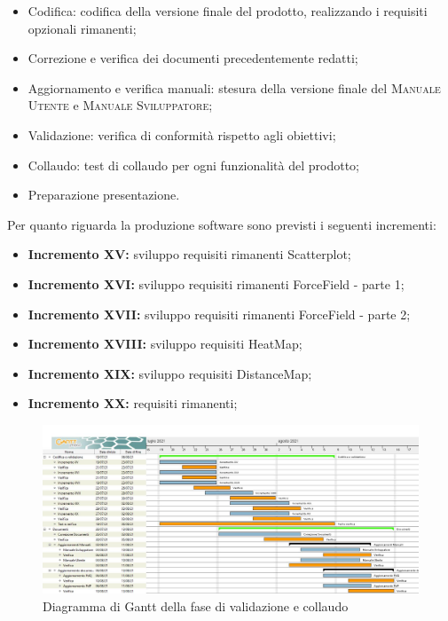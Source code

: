 \documentclass[../piano_di_progetto.tex]{subfiles}
\begin{document}
\begin{itemize}
    \item Codifica: codifica della versione finale del prodotto, realizzando i requisiti opzionali rimanenti;
    \item Correzione e verifica dei documenti precedentemente redatti;
    \item Aggiornamento e verifica manuali: stesura della versione finale del \textsc{Manuale Utente} e \textsc{Manuale Sviluppatore};
    \item Validazione: verifica di conformità rispetto agli obiettivi;
    \item Collaudo: test di collaudo per ogni funzionalità del prodotto;
    \item Preparazione presentazione.
\end{itemize}

Per quanto riguarda la produzione software sono previsti i seguenti incrementi:
\begin{itemize}
    \item \textbf{Incremento XV:} sviluppo requisiti rimanenti Scatterplot;
    \item \textbf{Incremento XVI:} sviluppo requisiti rimanenti ForceField - parte 1;
    \item \textbf{Incremento XVII:} sviluppo requisiti rimanenti ForceField - parte 2;
    \item \textbf{Incremento XVIII:} sviluppo requisiti HeatMap;
    \item \textbf{Incremento XIX:} sviluppo requisiti DistanceMap;
    \item \textbf{Incremento XX:} requisiti rimanenti;
\end{itemize}


\begin{figure}[H]
\centering
\includegraphics[width=18cm]{src/img/gantt/pianif_RA.jpg}
\caption{Diagramma di Gantt della fase di validazione e collaudo}
\end{figure}
\end{document}
